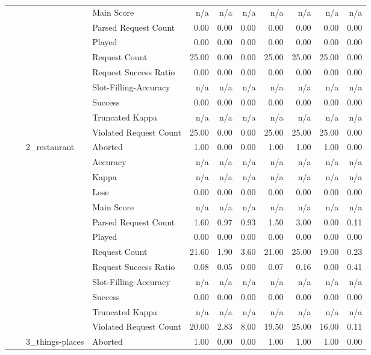 \begin{tabular}{llllrrrrrrr}
 &  &  & Main Score & n/a & n/a & n/a & n/a & n/a & n/a & n/a \\
 &  &  & Parsed Request Count & 0.00 & 0.00 & 0.00 & 0.00 & 0.00 & 0.00 & 0.00 \\
 &  &  & Played & 0.00 & 0.00 & 0.00 & 0.00 & 0.00 & 0.00 & 0.00 \\
 &  &  & Request Count & 25.00 & 0.00 & 0.00 & 25.00 & 25.00 & 25.00 & 0.00 \\
 &  &  & Request Success Ratio & 0.00 & 0.00 & 0.00 & 0.00 & 0.00 & 0.00 & 0.00 \\
 &  &  & Slot-Filling-Accuracy & n/a & n/a & n/a & n/a & n/a & n/a & n/a \\
 &  &  & Success & 0.00 & 0.00 & 0.00 & 0.00 & 0.00 & 0.00 & 0.00 \\
 &  &  & Truncated Kappa & n/a & n/a & n/a & n/a & n/a & n/a & n/a \\
 &  &  & Violated Request Count & 25.00 & 0.00 & 0.00 & 25.00 & 25.00 & 25.00 & 0.00 \\
\cline{3-11}
 &  & \multirow[t]{13}{*}{2_restaurant} & Aborted & 1.00 & 0.00 & 0.00 & 1.00 & 1.00 & 1.00 & 0.00 \\
 &  &  & Accuracy & n/a & n/a & n/a & n/a & n/a & n/a & n/a \\
 &  &  & Kappa & n/a & n/a & n/a & n/a & n/a & n/a & n/a \\
 &  &  & Lose & 0.00 & 0.00 & 0.00 & 0.00 & 0.00 & 0.00 & 0.00 \\
 &  &  & Main Score & n/a & n/a & n/a & n/a & n/a & n/a & n/a \\
 &  &  & Parsed Request Count & 1.60 & 0.97 & 0.93 & 1.50 & 3.00 & 0.00 & 0.11 \\
 &  &  & Played & 0.00 & 0.00 & 0.00 & 0.00 & 0.00 & 0.00 & 0.00 \\
 &  &  & Request Count & 21.60 & 1.90 & 3.60 & 21.00 & 25.00 & 19.00 & 0.23 \\
 &  &  & Request Success Ratio & 0.08 & 0.05 & 0.00 & 0.07 & 0.16 & 0.00 & 0.41 \\
 &  &  & Slot-Filling-Accuracy & n/a & n/a & n/a & n/a & n/a & n/a & n/a \\
 &  &  & Success & 0.00 & 0.00 & 0.00 & 0.00 & 0.00 & 0.00 & 0.00 \\
 &  &  & Truncated Kappa & n/a & n/a & n/a & n/a & n/a & n/a & n/a \\
 &  &  & Violated Request Count & 20.00 & 2.83 & 8.00 & 19.50 & 25.00 & 16.00 & 0.11 \\
\cline{3-11}
 &  & \multirow[t]{14}{*}{3_things-places} & Aborted & 1.00 & 0.00 & 0.00 & 1.00 & 1.00 & 1.00 & 0.00 \\

\end{tabular}

